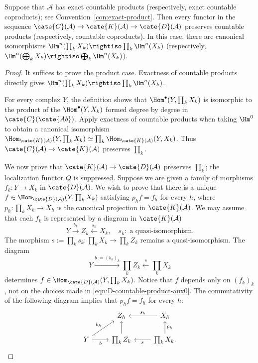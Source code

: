 \begin{lemma}\label{prop:D-countable-product}
	Suppose that $\mathcal{A}$ has exact countable products (respectively,
	exact countable coproducts); see Convention~\ref{con:exact-product}. Then
	every functor in the sequence
	$\cate{C}(\mathcal{A})\to\cate{K}(\mathcal{A})\to\cate{D}(\mathcal{A})$
	preserves countable products (respectively, countable coproducts). In this
	case, there are canonical isomorphisms
	$\Hm^n(\prod_kX_k)\rightiso\prod_k\Hm^n(X_k)$ (respectively,
	$\Hm^n(\bigoplus_kX_k)\rightiso\bigoplus_k\Hm^n(X_k)$).
\end{lemma}
\begin{proof}
	It suffices to prove the product case. Exactness of countable products
	directly gives $\Hm^n(\prod_kX_k)\rightiso\prod_k\Hm^n(X_k)$.

	For every complex $Y$, the definition shows that
	$\Hom^\bullet(Y,\prod_kX_k)$ is isomorphic to the product of the
	$\Hom^\bullet(Y,X_k)$ formed degree by degree in $\cate{C}(\cate{Ab})$.
	Apply exactness of countable products when taking $\Hm^0$ to obtain a
	canonical isomorphism
	$\Hom_{\cate{K}(\mathcal{A})}(Y,\prod_kX_k)\simeq
	\prod_k\Hom_{\cate{K}(\mathcal{A})}(Y,X_k)$. Thus
	$\cate{C}(\mathcal{A})\to\cate{K}(\mathcal{A})$ preserves $\prod_k$.

	We now prove that $\cate{K}(\mathcal{A})\to\cate{D}(\mathcal{A})$
	preserves $\prod_k$; the localization functor $Q$ is suppressed. Suppose we
	are given a family of morphisms $f_k:Y\to X_k$ in
	$\cate{D}(\mathcal{A})$. We wish to prove that there is a unique
	$f\in\Hom_{\cate{D}(\mathcal{A})}(Y,\prod_kX_k)$ satisfying
	$p_hf=f_h$ for every $h$, where $p_h:\prod_kX_k\to X_h$ is the canonical
	projection in $\cate{K}(\mathcal{A})$. We may assume that each $f_k$ is
	represented by a diagram in $\cate{K}(\mathcal{A})$
	\begin{equation}\label{eqn:D-countable-product-aux0}
		Y \xrightarrow{b_k} Z_k \xleftarrow{s_k} X_k, \quad s_k:\; \text{a quasi-isomorphism}.
	\end{equation}
	The morphism $s:=\prod_ks_k:\prod_kX_k\to\prod_kZ_k$ remains a
	quasi-isomorphism. The diagram
	\[ Y \xrightarrow{b := (b_k)_k} \prod_k Z_k \xleftarrow{s} \prod_k X_k \]
	determines $f\in\Hom_{\cate{D}(\mathcal{A})}(Y,\prod_kX_k)$. Notice that
	$f$ depends only on $(f_k)_k$, not on the choices made in
	\eqref{eqn:D-countable-product-aux0}. The commutativity of the following
	diagram implies that $p_hf=f_h$ for every $h$:
	\[\begin{tikzcd}
		& Z_h & X_h \arrow[l, "s_h"'] \\
		Y \arrow[r, "b"'] \arrow[ru, "b_h"] & \prod_k Z_k \arrow[u] & \prod_k X_k \arrow[l, "s"] \arrow[u, "p_h"'] .
	\end{tikzcd} \]


\end{proof}
